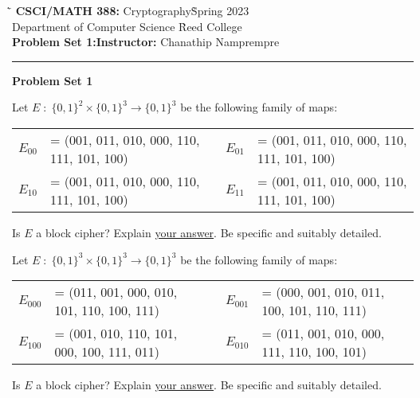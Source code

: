 \documentclass{exam}
\def\COURSENAME{Cryptography}
\def\COURSECODE{CSCI/MATH 388}
\def\YEAR{2023}
\newcommand{\Colon}{\;:\;}
\newcommand{\bits}{\{0,1\}}
\begin{document}
\begin{tabbing}
  \`\=\kill
  \textbf{\COURSECODE:} \COURSENAME \` Spring \YEAR \\
  Department of Computer Science \` Reed College \\
  \textbf{Problem Set 1:}\` \textbf{Instructor:} Chanathip Namprempre
\end{tabbing}


\hrule

\vspace{.4in}

\begin{center}
\textbf{\Large Problem Set 1}
\end{center}


\vspace{.2in}


\begin{questions}

  \question Let $E \Colon \bits^2 \times \bits^3 \rightarrow \bits^3$ be the following family of maps:
  \begin{center}
    \begin{small}
      \begin{tabular}{lllll}
        $E_{00}$ & = (001, 011, 010, 000, 110, 111, 101, 100) &&
        $E_{01}$ & = (001, 011, 010, 000, 110, 111, 101, 100) \\
        $E_{10}$ & = (001, 011, 010, 000, 110, 111, 101, 100) &&
        $E_{11}$ & = (001, 011, 010, 000, 110, 111, 101, 100) 
      \end{tabular}
    \end{small}%
  \end{center}
  \noindent Is $E$ a block cipher? Explain \underline{your answer}. Be specific and suitably detailed.

  \bigskip
  
  \question Let $E \Colon \bits^3 \times \bits^3 \rightarrow \bits^3$ be the following family of maps:
  \begin{center}
    \begin{small}
      \begin{tabular}{lllll}
        $E_{000}$ & = (011, 001, 000, 010, 101, 110, 100, 111)  &&
        $E_{001}$ & = (000, 001, 010, 011, 100, 101, 110, 111) \\
        $E_{100}$ & = (001, 010, 110, 101, 000, 100, 111, 011)  &&
        $E_{010}$ & = (011, 001, 010, 000, 111, 110, 100, 101) 
      \end{tabular}
    \end{small}%
  \end{center}
  \noindent Is $E$ a block cipher? Explain \underline{your answer}. Be specific and suitably detailed.


\end{questions}
\end{document}
